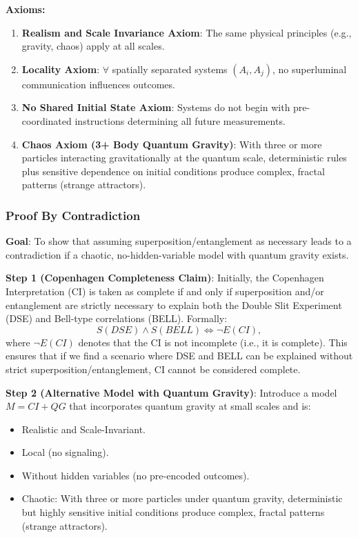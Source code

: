 \documentclass{report}
\begin{document}
\textbf{Axioms:}
\begin{enumerate}
    \item \textbf{Realism and Scale Invariance Axiom}: The same physical principles (e.g., gravity, chaos) apply at all scales.
    \item \textbf{Locality Axiom}: $\forall$ spatially separated systems $(A_i,A_j)$, no superluminal communication influences outcomes.
    \item \textbf{No Shared Initial State Axiom}: Systems do not begin with pre-coordinated instructions determining all future measurements.
    \item \textbf{Chaos Axiom (3+ Body Quantum Gravity)}: With three or more particles interacting gravitationally at the quantum scale, deterministic rules plus sensitive dependence on initial conditions produce complex, fractal patterns (strange attractors).
\end{enumerate}

\subsubsection*{Proof By Contradiction}

\textbf{Goal}: To show that assuming superposition/entanglement as necessary leads to a contradiction if a chaotic, no-hidden-variable model with quantum gravity exists.

\textbf{Step 1 (Copenhagen Completeness Claim)}:
 Initially, the Copenhagen Interpretation (CI) is taken as complete if and only if superposition and/or entanglement are strictly necessary to explain both the Double Slit Experiment (DSE) and Bell-type correlations (BELL). Formally:
\[
S(DSE) \wedge S(BELL) \iff \neg E(CI),
\]
where $\neg E(CI)$ denotes that the CI is not incomplete (i.e., it is complete). This ensures that if we find a scenario where DSE and BELL can be explained without strict superposition/entanglement, CI cannot be considered complete.

\textbf{Step 2 (Alternative Model with Quantum Gravity)}:
Introduce a model $M = CI + QG$ that incorporates quantum gravity at small scales and is:
\begin{itemize}
    \item Realistic and Scale-Invariant.
    \item Local (no signaling).
    \item Without hidden variables (no pre-encoded outcomes).
    \item Chaotic: With three or more particles under quantum gravity, deterministic but highly sensitive initial conditions produce complex, fractal patterns (strange attractors).
\end{itemize}
\end{document}
